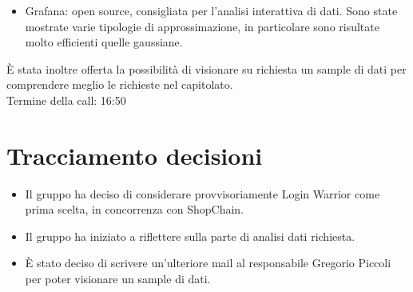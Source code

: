 \begin{itemize}
	\item Grafana: open source, consigliata per l'analisi interattiva di dati. Sono state mostrate varie tipologie di approssimazione, in particolare sono risultate molto efficienti quelle gaussiane.
\end{itemize}

\noindent 
\`E stata inoltre offerta la possibilità di visionare su richiesta un sample di dati per comprendere meglio le richieste nel capitolato. \\

\noindent
Termine della call: 16:50

\section{Tracciamento decisioni}

\begin{itemize}
	\item Il gruppo ha deciso di considerare provvisoriamente Login Warrior come prima scelta, in concorrenza con ShopChain.
	\item Il gruppo ha iniziato a riflettere sulla parte di analisi dati richiesta.
	\item \`E stato deciso di scrivere un'ulteriore mail al responsabile Gregorio Piccoli per poter visionare un sample di dati.
\end{itemize}